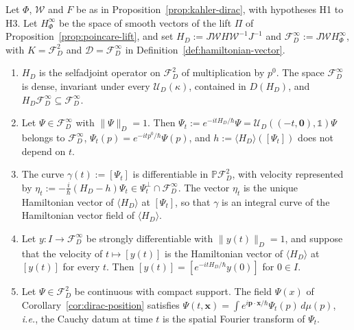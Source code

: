 \begin{proposition}\label{prop:dirac-flow}
	Let $\Phi$, $\mathcal{W}$ and $F$ be as in Proposition~\ref{prop:kahler-dirac}, with hypotheses H1 to H3. Let $H^\infty_\Phi$ be the space of smooth vectors of the lift $\Pi$ of Proposition~\ref{prop:poincare-lift}, and set $H_D:=J\mathcal{W}H\mathcal{W}^{-1}J^{-1}$ and $\mathcal{F}_D^\infty:=J\mathcal{W}H^\infty_\Phi$, with $K=\mathcal{F}_D^2$ and $\mathcal{D}=\mathcal{F}_D^\infty$ in Definition~\ref{def:hamiltonian-vector}.
	\begin{enumerate}
		\item $H_D$ is the selfadjoint operator on $\mathcal{F}_D^2$ of multiplication by $p^0$. The space $\mathcal{F}_D^\infty$ is dense, invariant under every $\mathcal{U}_D(\kappa)$, contained in $D(H_D)$, and $H_D\mathcal{F}_D^\infty\subseteq\mathcal{F}_D^\infty$.
		\item Let $\Psi\in\mathcal{F}_D^\infty$ with $\|\Psi\|_D=1$. Then $\Psi_t:=e^{-itH_D/\hbar}\Psi=\mathcal{U}_D((-t,\mathbf{0}),\mathbb{1})\Psi$ belongs to $\mathcal{F}_D^\infty$, $\Psi_t(p)=e^{-itp^0/\hbar}\Psi(p)$, and $h:=\langle H_D\rangle([\Psi_t])$ does not depend on $t$.
		\item The curve $\gamma(t):=[\Psi_t]$ is differentiable in $\mathbb{P}\mathcal{F}_D^2$, with velocity represented by $\eta_t:=-\tfrac{i}{\hbar}(H_D-h)\Psi_t\in\Psi_t^\perp\cap\mathcal{F}_D^\infty$. The vector $\eta_t$ is the unique Hamiltonian vector of $\langle H_D\rangle$ at $[\Psi_t]$, so that $\gamma$ is an integral curve of the Hamiltonian vector field of $\langle H_D\rangle$.
		\item Let $y:I\to\mathcal{F}_D^\infty$ be strongly differentiable with $\|y(t)\|_D=1$, and suppose that the velocity of $t\mapsto[y(t)]$ is the Hamiltonian vector of $\langle H_D\rangle$ at $[y(t)]$ for every $t$. Then $[y(t)]=[e^{-itH_D/\hbar}y(0)]$ for $0\in I$.
		\item Let $\Psi\in\mathcal{F}_D^2$ be continuous with compact support. The field $\Psi(x)$ of Corollary~\ref{cor:dirac-position} satisfies $\Psi(t,\mathbf{x})=\int e^{i\mathbf{p}\cdot\mathbf{x}/\hbar}\Psi_t(p)\,d\mu(p)$, \textit{i.e.}, the Cauchy datum at time $t$ is the spatial Fourier transform of $\Psi_t$.
	\end{enumerate}
\end{proposition}

